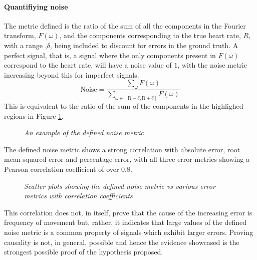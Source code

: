 \paragraph{Quantifiying noise}
The metric defined is the ratio of the sum of all the components in the Fourier transform, $F(\omega)$, and the components corresponding to the true heart rate, $R$, with a range ,$\delta$, being included to discount
for errors in the ground truth. A perfect signal, that is, a signal where the only components present in $F(\omega)$ correspond to the heart rate, will have a noise value of $1$, with the noise metric increasing beyond this for imperfect signals.
\begin{equation*}
    \text{Noise} = \frac{\sum_{\omega} F(\omega)}{ \sum_{\omega \in [\text{R}-\delta, \text{R}+\delta ]}F(\omega)}  
\end{equation*}
This is equivalent to the ratio of the sum of the components in the highlighed regions in Figure \ref{fig:noise_metric}.
\begin{figure}[H]
    \centering
    \subfloat{\scalebox{0.8}{}}%
    \subfloat{\scalebox{0.8}{ }}%
    \subfloat{\scalebox{0.8}{ }}%
   \caption{\textit{An example of the defined noise metric} }
   \label{fig:noise_metric}
\end{figure}
\noindent
The defined noise metric shows a strong correlation with absolute error, root mean squared error and percentage error, with all three error metrics showing a Pearson correlation coefficient of over 0.8.
\begin{figure}[H]
    \centering
    \subfloat{\scalebox{0.6}{}}
    \subfloat{\scalebox{0.6}{}}
    \subfloat{\scalebox{0.6}{}}
    \caption{\textit{Scatter plots showing the defined noise metric vs various error metrics with correlation coefficients}}
\end{figure}
\noindent
This correlation does not, in itself, prove that the cause of the increasing error is frequency of movement but, rather,
it indicates that large values of the defined noise metric is a common property of signals which exhibit larger errors.
Proving causality is not, in general, possible and hence the evidence showcased is the strongest possible proof of the hypothesis proposed.


